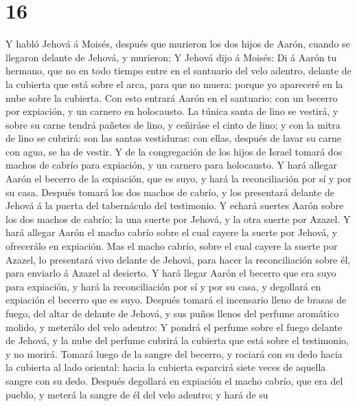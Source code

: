 \hypertarget{section-15}{%
\section{16}\label{section-15}}

 Y habló Jehová á Moisés, después que murieron los dos hijos
de Aarón, cuando se llegaron delante de Jehová, y murieron; 
Y Jehová dijo á Moisés: Di á Aarón tu hermano, que no en todo tiempo
entre en el santuario del velo adentro, delante de la cubierta que está
sobre el arca, para que no muera: porque yo apareceré en la nube sobre
la cubierta.  Con esto entrará Aarón en el santuario: con un
becerro por expiación, y un carnero en holocausto.  La
túnica santa de lino se vestirá, y sobre su carne tendrá pañetes de
lino, y ceñiráse el cinto de lino; y con la mitra de lino se cubrirá:
son las santas vestiduras: con ellas, después de lavar su carne con
agua, se ha de vestir.  Y de la congregación de los hijos de
Israel tomará dos machos de cabrío para expiación, y un carnero para
holocausto.  Y hará allegar Aarón el becerro de la
expiación, que es suyo, y hará la reconciliación por sí y por su casa.
 Después tomará los dos machos de cabrío, y los presentará
delante de Jehová á la puerta del tabernáculo del testimonio.
 Y echará suertes Aarón sobre los dos machos de cabrío; la
una suerte por Jehová, y la otra suerte por Azazel.  Y hará
allegar Aarón el macho cabrío sobre el cual cayere la suerte por Jehová,
y ofrecerálo en expiación.  Mas el macho cabrío, sobre el
cual cayere la suerte por Azazel, lo presentará vivo delante de Jehová,
para hacer la reconciliación sobre él, para enviarlo á Azazel al
desierto.  Y hará llegar Aarón el becerro que era suyo para
expiación, y hará la reconciliación por sí y por su casa, y degollará en
expiación el becerro que es suyo.  Después tomará el
incensario lleno de brasas de fuego, del altar de delante de Jehová, y
sus puños llenos del perfume aromático molido, y meterálo del velo
adentro:  Y pondrá el perfume sobre el fuego delante de
Jehová, y la nube del perfume cubrirá la cubierta que está sobre el
testimonio, y no morirá.  Tomará luego de la sangre del
becerro, y rociará con su dedo hacia la cubierta al lado oriental: hacia
la cubierta esparcirá siete veces de aquella sangre con su dedo.
 Después degollará en expiación el macho cabrío, que era
del pueblo, y meterá la sangre de él del velo adentro; y hará de su
